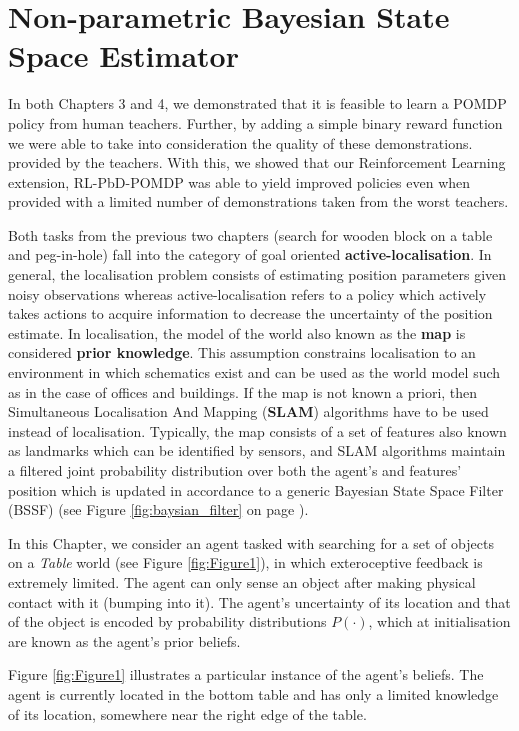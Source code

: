 \chapter{Non-parametric Bayesian State Space Estimator}

In both Chapters 3 and 4, we demonstrated that it is feasible to learn a POMDP policy from human teachers. Further,
by adding a simple binary reward function we were able to take into consideration the quality of these demonstrations. 
provided by the teachers. With this, we showed that our Reinforcement Learning extension, RL-PbD-POMDP was able to 
yield improved policies even when provided with a limited number of demonstrations taken from the worst teachers.

Both tasks from the previous two chapters (search for wooden block on a table and peg-in-hole) fall into 
the category of goal oriented \textbf{active-localisation}. In general, the localisation problem consists of estimating 
position parameters given noisy observations whereas active-localisation refers to a policy which actively takes actions to 
acquire information to decrease the uncertainty of the position estimate. In localisation, the model 
of the world also known as the \textbf{map} is considered \textbf{prior knowledge}. This assumption constrains localisation 
to an environment in which schematics exist and can be used 
as the world model such as in the case of offices and buildings. If the map is not known a priori, then Simultaneous Localisation And Mapping (\textbf{SLAM}) algorithms have to be used instead
of localisation. Typically, the map consists of a set of features also known as landmarks which can be identified by sensors, 
and SLAM algorithms maintain a filtered joint probability distribution over both the agent's and features' position which is updated in accordance to a generic 
Bayesian State Space Filter (BSSF) (see Figure \ref{fig:baysian_filter} on page \pageref{fig:baysian_filter}).

In this Chapter, we consider an agent tasked with searching for a set of objects on a \textit{Table} world (see Figure \ref{fig:Figure1}), 
in which exteroceptive feedback is extremely limited. The agent can only sense an object after making physical 
contact with it (bumping into it). The agent's uncertainty of its location and that of the object is encoded by probability distributions $P(\cdot)$, which 
at initialisation are known as the agent's prior beliefs.

Figure \ref{fig:Figure1} illustrates a particular instance of the agent's beliefs. The agent is currently located in the 
bottom  table and has only a limited knowledge of its location, somewhere near the right edge of the table. 

